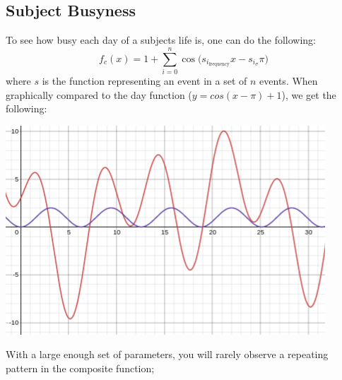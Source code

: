 \documentclass[11pt]{article}
\begin{document}
\subsection{Subject Busyness}
\label{sec:org2b46bd2}
To see how busy each day of a subjects life is, one can do the following:
\begin{equation}
    f_c(x) = 1 + \sum_{i=0}^{n}{ \cos(s_i_{\text{frequency}}x - s_i_{\sigma} \pi})
\end{equation}
where \(s\) is the function representing an event in a set of \(n\) events. When graphically compared to the day function (\(y = cos(x - \pi) + 1\)), we get the following:
\begin{center}
\includegraphics[width=.9\linewidth]{./media/activity_density.png}
\end{center}
With a large enough set of parameters, you will rarely observe a repeating pattern in the composite function;
\end{document}

